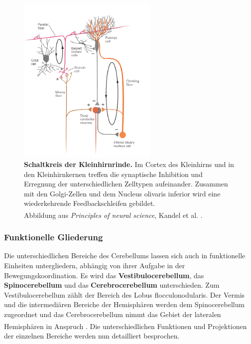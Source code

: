 \documentclass[12pt,a4paper,pdftex]{article}
\begin{document}
\begin{figure}[H]
    \centering
    \includegraphics[width=0.6\textwidth]{pictures/Bilder_Laura/circuit-cerebellum.PNG}
    \caption[Schaltkreis der Kleinhirnrinde]{\textbf{Schaltkreis der Kleinhirnrinde.} Im Cortex des Kleinhirns und in den Kleinhirnkernen treffen die synaptische Inhibition und Erregnung der unterschiedlichen Zelltypen aufeinander. Zusammen mit den Golgi-Zellen und dem Nucleus olivaris inferior wird eine wiederkehrende Feedbackschleifen gebildet. \\ Abbildung aus \textit{Principles of neural science}, Kandel et al. \textsuperscript{\cite[42]{kandel2013principles}}.}
    \label{fig:schaltkreis_kleinhirn}
\end{figure}

\subsubsection{Funktionelle Gliederung}
Die unterschiedlichen Bereiche des Cerebellums lassen sich auch in funktionelle Einheiten untergliedern, abhängig von ihrer Aufgabe in der Bewegungskoordination. Es wird das \textbf{Vestibulocerebellum}, das \textbf{Spinocerebellum} und das \textbf{Cerebrocerebellum} unterschieden. Zum Vestibulocerebellum zählt der Bereich des Lobus flocculonodularis. Der Vermis und die intermediären Bereiche der Hemisphären werden dem Spinocerebellum zugeordnet und das Cerebrocerebellum nimmt das Gebiet der lateralen Hemisphären in Anspruch \textsuperscript{\cite[42]{kandel2013principles}}. Die unterschiedlichen Funktionen und Projektionen der einzelnen Bereiche werden nun detailliert besprochen. 
\end{document}

